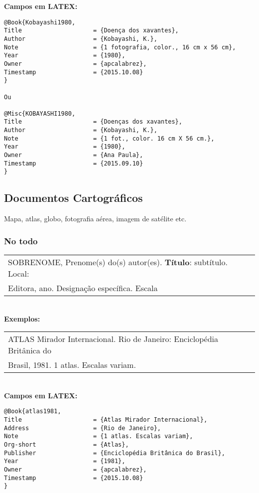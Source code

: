 \textbf{Campos em LATEX:} 

\begin{verbatim}
@Book{Kobayashi1980,
Title                    = {Doença dos xavantes},
Author                   = {Kobayashi, K.},
Note                     = {1 fotografia, color., 16 cm x 56 cm},
Year                     = {1980},
Owner                    = {apcalabrez},
Timestamp                = {2015.10.08}
}

Ou

@Misc{KOBAYASHI1980,
Title                    = {Doenças dos xavantes},
Author                   = {Kobayashi, K.},
Note                     = {1 fot., color. 16 cm X 56 cm.},
Year                     = {1980},
Owner                    = {Ana Paula},
Timestamp                = {2015.09.10}
}
\end{verbatim}


\subsection{Documentos Cartográficos}

Mapa, atlas, globo, fotografia aérea, imagem de satélite etc. 
\subsubsection{No todo}

\begin{tabular}{|l|c|} \hline
	SOBRENOME, Prenome(s) do(s) autor(es). \textbf{Título}: subtítulo. Local: \\
	Editora, ano. Designação específica. Escala
	\\\hline
\end{tabular} \\

\textbf{Exemplos:} \\

\begin{tabular}{|l|c|} \hline
	ATLAS Mirador Internacional. Rio de Janeiro: Enciclopédia Britânica do\\
	Brasil, 1981. 1 atlas. Escalas variam. 
	\\\hline
\end{tabular} \\

\textbf{Campos em LATEX:} 

\begin{verbatim}
@Book{atlas1981,
Title                    = {Atlas Mirador Internacional},
Address                  = {Rio de Janeiro},
Note                     = {1 atlas. Escalas variam},
Org-short                = {Atlas},
Publisher                = {Enciclopédia Britânica do Brasil},
Year                     = {1981},
Owner                    = {apcalabrez},
Timestamp                = {2015.10.08}
}
\end{verbatim}

